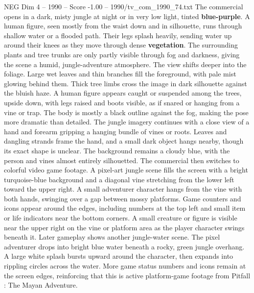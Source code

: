 \begin{textsample}{NEG Dim 4 – 1990 – Score -1.00 – 1990/tv\_com\_1990\_74.txt}  \label{ex:f4_neg_026}
The commercial opens in a dark, misty jungle at night or in very low light, tinted \textbf{blue-purple}.
A human figure, seen mostly from the waist down and in silhouette, runs through shallow water or a flooded path.
Their legs splash heavily, sending water up around their knees as they move through dense \textbf{vegetation}.
The surrounding plants and tree trunks are only partly visible through fog and darkness, giving the scene a humid, jungle-adventure atmosphere.
The view shifts deeper into the foliage.
Large wet leaves and thin branches fill the foreground, with pale mist glowing behind them.
Thick tree limbs cross the image in dark silhouette against the bluish haze.
A human figure appears caught or suspended among the trees, upside down, with legs raised and boots visible, as if snared or hanging from a vine or trap.
The body is mostly a black outline against the fog, making the pose more dramatic than detailed.
The jungle imagery continues with a close view of a hand and forearm gripping a hanging bundle of vines or roots.
Leaves and dangling strands frame the hand, and a small dark object hangs nearby, though its exact shape is unclear.
The background remains a cloudy blue, with the person and vines almost entirely silhouetted.
The commercial then switches to colorful video game footage.
A pixel-art jungle scene fills the screen with a bright turquoise-blue background and a diagonal vine stretching from the lower left toward the upper right.
A small adventurer character hangs from the vine with both hands, swinging over a gap between mossy platforms.
Game counters and icons appear around the edges, including numbers at the top left and small item or life indicators near the bottom corners.
A small creature or figure is visible near the upper right on the vine or platform area as the player character swings beneath it.
Later gameplay shows another jungle-water scene.
The pixel adventurer drops into bright blue water beneath a rocky, green jungle overhang.
A large white splash bursts upward around the character, then expands into rippling circles across the water.
More game status numbers and icons remain at the screen edges, reinforcing that this is active platform-game footage from Pitfall : The Mayan Adventure.

\end{textsample}
